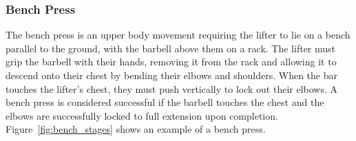 \subsubsection{Bench Press}

The bench press is an upper body movement requiring the lifter to lie on a bench parallel to the ground, with the barbell above them on a rack. The lifter must grip the barbell with their hands, removing it from the rack and allowing it to descend onto their chest by bending their elbows and shoulders. When the bar touches the lifter's chest, they must push vertically to lock out their elbows. A bench press is considered successful if the barbell touches the chest and the elbows are successfully locked to full extension upon completion. Figure~\ref{fig:bench_stages} shows an example of a bench press.

